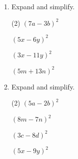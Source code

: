\begin{enumerate} [leftmargin=0cm]
\item Expand and simplify.
\begin{tasks}[label=(\arabic*), after-item-skip=2pt,after-skip=3pt, label-width=4ex](2)
    \task  $ (7a- 3b)^2  $    \\  \begin{envAnswer} { }\end{envAnswer}
    \task  $ (5x- 6y)^2  $    \\  \begin{envAnswer} { }\end{envAnswer}
    \task  $ (3x-11y)^2  $    \\  \begin{envAnswer} { }\end{envAnswer}
    \task  $ (5m+13n)^2  $    \\  \begin{envAnswer} { }\end{envAnswer}
\end{tasks}


\item Expand and simplify.
\begin{tasks}[label=(\arabic*), after-item-skip=2pt,after-skip=3pt, label-width=4ex](2)
    \task  $ (5a- 2b)^2  $    \\  \begin{envAnswer} { }\end{envAnswer}
    \task  $ (8m- 7n)^2  $    \\  \begin{envAnswer} { }\end{envAnswer}
    \task  $ (3c- 8d)^2  $    \\  \begin{envAnswer} { }\end{envAnswer}
    \task  $ (5x- 9y)^2  $    \\  \begin{envAnswer} { }\end{envAnswer}
\end{tasks}





\end{enumerate}
